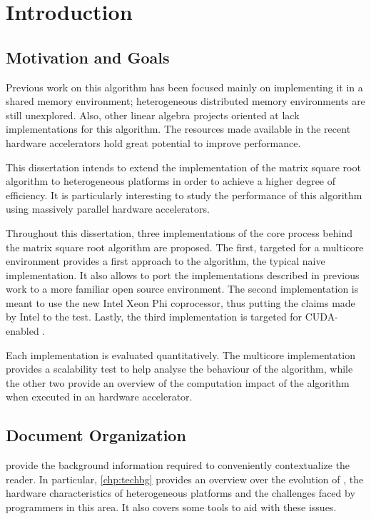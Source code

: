 \documentclass[../thesis]{subfiles}
\begin{document}
	\chapter{Introduction}
	\label{chp:intro}


	\section{Motivation and Goals}
	Previous work on this algorithm has been focused mainly on implementing it in a \cpu shared memory environment; heterogeneous distributed memory environments are still unexplored. Also, other linear algebra projects oriented at \gpus lack implementations for this algorithm. The resources made available in the recent hardware accelerators hold great potential to improve performance.

	This dissertation intends to extend the implementation of the matrix square root algorithm to heterogeneous platforms in order to achieve a higher degree of efficiency. It is particularly interesting to study the performance of this algorithm using massively parallel hardware accelerators.

	Throughout this dissertation, three implementations of the core process behind the matrix square root algorithm are proposed. The first, targeted for a multicore environment provides a first approach to the algorithm, the typical naive implementation. It also allows to port the implementations described in previous work to a more familiar open source environment. The second implementation is meant to use the new Intel Xeon Phi coprocessor, thus putting the claims made by Intel to the test. Lastly, the third implementation is targeted for CUDA-enabled \gpus.

	Each implementation is evaluated quantitatively. The multicore implementation provides a scalability test to help analyse the behaviour of the algorithm, while the other two provide an overview of the computation impact of the algorithm when executed in an hardware accelerator.

	\section{Document Organization}
	 provide the background information required to conveniently contextualize the reader. In particular, \cref{chp:techbg} provides an overview over the evolution of \hpc, the hardware characteristics of heterogeneous platforms and the challenges faced by programmers in this area. It also covers some tools to aid with these issues.
\end{document}
